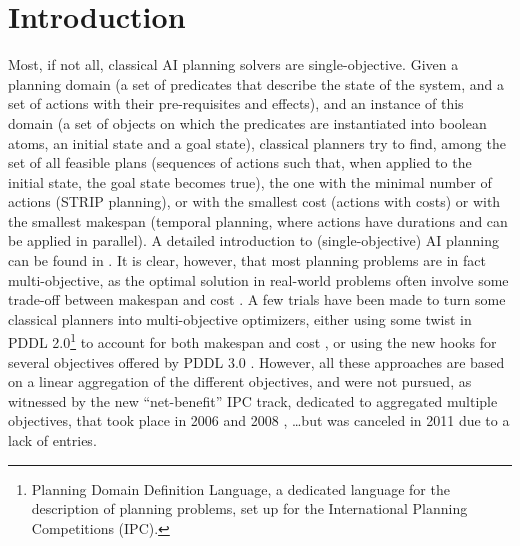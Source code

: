 \documentclass{llncs}
\begin{document}
\section{Introduction}

Most, if not all, classical AI planning solvers are single-objective. Given a planning domain (a set of predicates that describe the state of the system, and a set of actions with their pre-requisites and effects), and an instance of this domain (a set of objects on which the predicates are instantiated into boolean atoms, an initial state and a goal state), classical planners try to find, among the set of all feasible plans (sequences of actions such that, when applied to the initial state, the goal state becomes true), the one with the minimal number of actions (STRIP planning), or with the smallest cost (actions with costs) or with the smallest makespan (temporal planning, where actions have durations and can be applied in parallel). A detailed introduction to (single-objective) AI planning can be found in \cite{AIplanningBook2004}. It is clear, however, that most planning problems are in fact multi-objective, as the optimal solution in real-world problems often involve some trade-off between makespan and 
cost \cite{kambhampati-invited-icaps03}. A few trials have been made to turn some classical planners into multi-objective optimizers, either using some twist in PDDL 2.0\footnote{Planning Domain Definition Language, a dedicated language for the description of planning problems, set up for the International Planning Competitions (IPC).} to account for both makespan and cost \cite{do2003sapa,refanidis2003multiobjective,gerevini2008}, or using the new hooks for several objectives offered by PDDL 3.0 \cite{gerevini2006preferences}. However, all these approaches are based on a linear aggregation of the different objectives, and were not pursued, as witnessed by the new ``net-benefit'' IPC track, dedicated to aggregated multiple objectives, that took place in 2006 \cite{chen2006temporal} and 2008 \cite{edelkamp2009optimal}, \ldots but was canceled in 2011 due to a lack of entries. 
\end{document}
